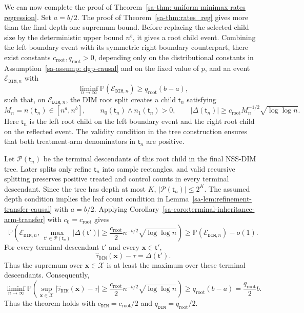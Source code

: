\documentclass[10pt]{article}
\def\nodet{\mathsf{t}}
\def\bx{\mathbf{x}}
\def\X{\mathcal{X}}
\def\P{\mathbb{P}}
\def\DIM{\mathtt{DIM}}
\theoremstyle{definition}
\theoremstyle{remark}
\begin{document}
We can now complete the proof of Theorem~\ref{sa-thm: uniform minimax rates regression}. Set $a=b/2$. The proof of Theorem~\ref{sa-thm:rates_reg} gives more than the final depth one supremum bound. Before replacing the selected child size by the deterministic upper bound $n^b$, it gives a root child event. Combining the left boundary event with its symmetric right boundary counterpart, there exist constants $c_{\mathrm{root}},q_{\mathrm{root}}>0$, depending only on the distributional constants in Assumption~\ref{sa-assump: dgp-causal} and on the fixed value of $p$, and an event $\mathcal E_{\DIM,n}$ with
\[
    \liminf_{n\to\infty}\P(\mathcal E_{\DIM,n})
    \geq
    q_{\mathrm{root}}(b-a),
\]
such that, on $\mathcal E_{\DIM,n}$, the DIM root split creates a child $\nodet_n$ satisfying
\[
    M_n=n(\nodet_n)\in[n^a,n^b],
    \qquad
    n_0(\nodet_n)\wedge n_1(\nodet_n)>0,
    \qquad
    |\Delta(\nodet_n)|
    \geq
    c_{\mathrm{root}}M_n^{-1/2}\sqrt{\log\log n}.
\]
Here $\nodet_n$ is the left root child on the left boundary event and the right
root child on the reflected event. The validity condition in the tree
construction ensures that both treatment-arm denominators in $\nodet_n$ are
positive.

Let $\mathcal P(\nodet_n)$ be the terminal descendants of this root child in
the final NSS-DIM tree. Later splits only refine $\nodet_n$ into sample
rectangles, and valid recursive splitting preserves positive treated and
control counts in every terminal descendant. Since the tree has depth at most
$K$, $|\mathcal P(\nodet_n)|\leq 2^K$. The assumed depth condition implies the
leaf count condition in Lemma~\ref{sa-lem:refinement-transfer-causal} with
$a=b/2$. Applying Corollary~\ref{sa-coro:terminal-inheritance-arm-transfer}
with $c_0=c_{\mathrm{root}}$ gives
\[
    \P\left(
        \mathcal E_{\DIM,n},\
        \max_{\nodet'\in\mathcal P(\nodet_n)}
        |\Delta(\nodet')|
        \geq
        \frac{c_{\mathrm{root}}}{2}n^{-b/2}\sqrt{\log\log n}
    \right)
    \geq
    \P(\mathcal E_{\DIM,n})-o(1).
\]
For every terminal descendant $\nodet'$ and every $\bx\in\nodet'$,
\[
    \hat\tau_{\DIM}(\bx)-\tau
    =
    \Delta(\nodet').
\]
Thus the supremum over $\bx\in\X$ is at least the maximum over these terminal
descendants. Consequently,
\[
    \liminf_{n\to\infty}
    \P\left(
        \sup_{\bx\in\X}
        |\hat\tau_{\DIM}(\bx)-\tau|
        \geq
        \frac{c_{\mathrm{root}}}{2}n^{-b/2}\sqrt{\log\log n}
    \right)
    \geq
    q_{\mathrm{root}}(b-a)
    =
    \frac{q_{\mathrm{root}}}{2}b.
\]
Thus the theorem holds with $c_{\DIM}=c_{\mathrm{root}}/2$ and $q_{\DIM}=q_{\mathrm{root}}/2$.
\end{document}
